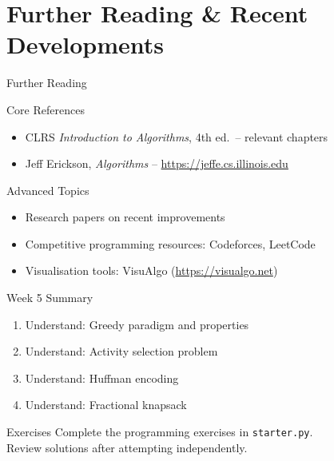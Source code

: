 \documentclass[aspectratio=169,xcolor=dvipsnames]{beamer}
\begin{document}
\section{Further Reading \& Recent Developments}
\begin{frame}{Further Reading}
  \begin{block}{Core References}
    \begin{itemize}
      \item CLRS \textit{Introduction to Algorithms}, 4th ed.\ -- relevant chapters
      \item Jeff Erickson, \textit{Algorithms} -- \url{https://jeffe.cs.illinois.edu}
    \end{itemize}
  \end{block}
  \begin{exampleblock}{Advanced Topics}
    \begin{itemize}
      \item Research papers on recent improvements
      \item Competitive programming resources: Codeforces, LeetCode
      \item Visualisation tools: VisuAlgo (\url{https://visualgo.net})
    \end{itemize}
  \end{exampleblock}
\end{frame}

\begin{frame}{Week 5 Summary}
  \begin{enumerate}
    \item Understand: Greedy paradigm and properties
    \item Understand: Activity selection problem
    \item Understand: Huffman encoding
    \item Understand: Fractional knapsack
  \end{enumerate}
  \begin{block}{Exercises}
    Complete the programming exercises in \texttt{starter.py}.\\
    Review solutions after attempting independently.
  \end{block}
\end{frame}
\end{document}
